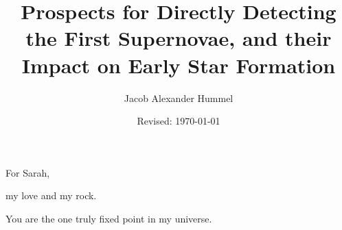 \documentclass[12pt,double]{thesis}
\begin{document}
\author{Jacob Alexander Hummel} 
\title{Prospects for Directly Detecting the First Supernovae, and their Impact on Early Star Formation} 
\date{Revised: \today}

\UTcopyrightlegend %

\begin{UTcommittee}
\end{UTcommittee}


\frontmatter

\begin{UTdedication}
For Sarah, 

my love and my rock.

\phantom{.}

You are the one truly fixed point in my universe.
\end{UTdedication}

\cleardoublepage
\setcounter{page}{5}
\end{document}
